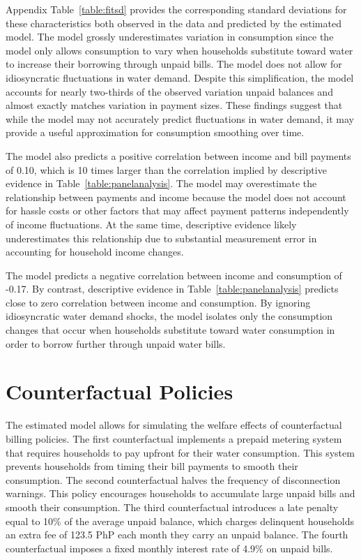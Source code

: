 \documentclass[12pt]{article}
\begin{document}
Appendix Table~\ref{table:fitsd} provides the corresponding standard deviations for these characteristics both observed in the data and predicted by the estimated model.  The model grossly underestimates variation in consumption since the model only allows consumption to vary when households substitute toward water to increase their borrowing through unpaid bills.  The model does not allow for idiosyncratic fluctuations in water demand.  Despite this simplification, the model accounts for nearly two-thirds of the observed variation unpaid balances and almost exactly matches variation in payment sizes.  These findings suggest that while the model may not accurately predict fluctuations in water demand, it may provide a useful approximation for consumption smoothing over time.

The model also predicts a positive correlation between income and bill payments of 0.10\unskip, which is 10 times larger than the correlation implied by descriptive evidence in Table~\ref{table:panelanalysis}.  The model may overestimate the relationship between payments and income because the model does not account for hassle costs or other factors that may affect payment patterns independently of income fluctuations.  At the same time, descriptive evidence likely underestimates this relationship due to substantial measurement error in accounting for household income changes.  

The model predicts a negative correlation between income and consumption of -0.17\unskip.  By contrast, descriptive evidence in Table~\ref{table:panelanalysis} predicts close to zero correlation between income and consumption.   By ignoring idiosyncratic water demand shocks, the model isolates only the consumption changes that occur when households substitute toward water consumption in order to borrow further through unpaid water bills. 

\section{Counterfactual Policies}\label{section:counterfactuals}

The estimated model allows for simulating the welfare effects of counterfactual billing policies.  The first counterfactual implements a prepaid metering system that requires households to pay upfront for their water consumption.  This system prevents households from timing their bill payments to smooth their consumption.  The second counterfactual halves the frequency of disconnection warnings.  This policy encourages households to accumulate large unpaid bills and smooth their consumption.  The third counterfactual introduces a late penalty equal to 10\% of the average unpaid balance, which charges delinquent households an extra fee of 123.5 PhP each month they carry an unpaid balance.  The fourth counterfactual imposes a fixed monthly interest rate of 4.9\% on unpaid bills.
\end{document}
